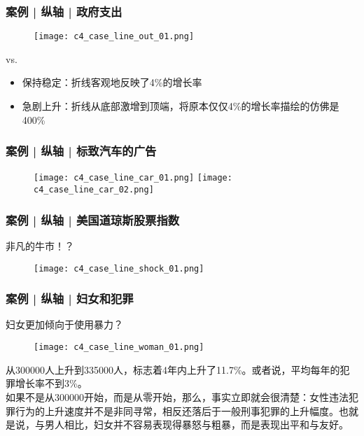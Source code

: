 \begin{frame}
  \frametitle{案例 | 纵轴 | 政府支出}
  \begin{figure}
    \centering
    \texttt{[image: c4\_case\_line\_out\_01.png]}
  \end{figure}
  \vspace{-1em}
  \begin{block}{vs.}
    \begin{itemize}
      \item 保持稳定：折线客观地反映了4\%的增长率
      \item 急剧上升：折线从底部激增到顶端，将原本仅仅4\%的增长率描绘的仿佛是400\%
    \end{itemize}
  \end{block}
\end{frame}

\begin{frame}
  \frametitle{案例 | 纵轴 | 标致汽车的广告}
  \begin{figure}
    \centering
    \texttt{[image: c4\_case\_line\_car\_01.png]}\quad
    \texttt{[image: c4\_case\_line\_car\_02.png]}
  \end{figure}
\end{frame}

\begin{frame}
  \frametitle{案例 | 纵轴 | 美国道琼斯股票指数}
  \begin{block}{非凡的牛市！？}
    \begin{figure}
      \centering
      \texttt{[image: c4\_case\_line\_shock\_01.png]}
    \end{figure}
  \end{block}
\end{frame}

\begin{frame}
  \frametitle{案例 | 纵轴 | 妇女和犯罪}
  \begin{block}{妇女更加倾向于使用暴力？}
    \begin{figure}
      \centering
      \texttt{[image: c4\_case\_line\_woman\_01.png]}
    \end{figure}
    \vspace{-1em}
    \pause
    从300000人上升到335000人，标志着4年内上升了11.7\%。或者说，平均每年的犯罪增长率不到3\%。\\
    \vspace{0.2em}
如果不是从300000开始，而是从零开始，那么，事实立即就会很清楚：女性违法犯罪行为的上升速度并不是非同寻常，相反还落后于一般刑事犯罪的上升幅度。也就是说，与男人相比，妇女并不容易表现得暴怒与粗暴，而是表现出平和与友好。
  \end{block}
\end{frame}


